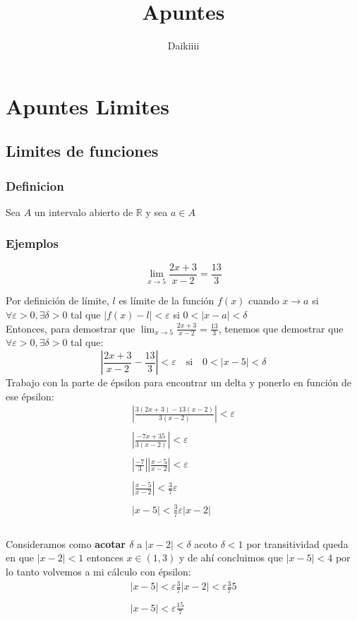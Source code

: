 \documentclass[a4paper]{article}
\title{Apuntes}
\author{Daikiiii}
\begin{document}
\maketitle
\section{Apuntes Limites}
\subsection{Limites de funciones}
\subsubsection{Definicion}
Sea $A$ un intervalo abierto de $\mathbb{R}$ y sea $a \in A$ 
\subsubsection{Ejemplos}
\begin{equation}
    \lim_{x \to 5}\frac{2x+3}{x-2}=\frac{13}{3}
\end{equation}

Por definición de límite, $l$ es límite de la función $f(x)$ cuando $x \rightarrow a$ si $\forall \varepsilon>0, \exists \delta >0$ tal que $|f(x)-l|<\varepsilon$ si $0<|x-a|<\delta$\\
Entonces, para demostrar que $\lim_{x \to 5}\frac{2x+3}{x-2}=\frac{13}{3}$, tenemos que demostrar que $\forall \varepsilon>0, \exists \delta >0$ tal que:
\begin{equation*}
        \left|\frac{2x+3}{x-2}-\frac{13}{3}\right|<\varepsilon \quad \text{si} \quad 0<|x-5|<\delta
\end{equation*}
Trabajo con la parte de épsilon para encontrar un delta y ponerlo en función de ese épsilon:
\begin{align*}  
    \left|\frac{3(2x+3)-13(x-2)}{3(x-2)}\right|<\varepsilon\\\\
    \left|\frac{-7x+35}{3(x-2)}\right|<\varepsilon\\\\
    \left|\frac{-7}{3}\right|\left|\frac{x-5}{x-2}\right|<\varepsilon\\\\
    \left|\frac{x-5}{x-2}\right|<\frac{3}{7}\varepsilon\\\\
    |x-5|<\frac{3}{7}\varepsilon|x-2|\\\\
\end{align*}

Consideramos como \textbf{acotar $\delta$} a $|x-2|<\delta$ acoto $\delta < 1$ por transitividad queda en que $|x-2|<1$ entonces $x \in (1,3)$ y de ahí concluimos que $|x-5|<4$ por lo tanto volvemos a mi cálculo con épsilon:
\begin{align*}  
    |x-5|<\varepsilon\frac{3}{7}|x-2|<\varepsilon\frac{3}{7} 5\\\\
    |x-5|<\varepsilon\frac{15}{7}
\end{align*}
\end{document}

